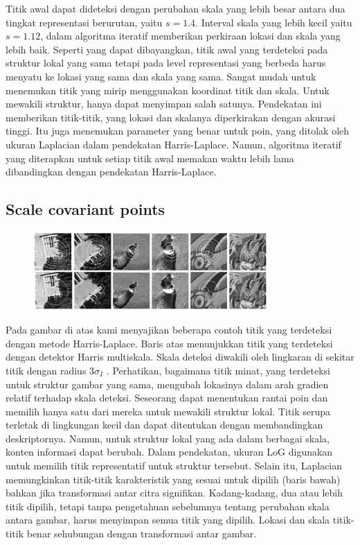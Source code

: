 Titik awal dapat dideteksi dengan perubahan skala yang lebih besar antara dua tingkat representasi berurutan, yaitu \(s = 1.4\). Interval skala yang lebih kecil yaitu \(s = 1.12\), dalam algoritma iteratif memberikan perkiraan lokasi dan skala yang lebih baik. Seperti yang dapat dibayangkan, titik awal yang terdeteksi pada struktur lokal yang sama tetapi pada level representasi yang berbeda harus menyatu ke lokasi yang sama dan skala yang sama. Sangat mudah untuk menemukan titik yang mirip menggunakan koordinat titik dan skala. Untuk mewakili struktur, hanya dapat menyimpan salah satunya. Pendekatan ini memberikan titik-titik, yang lokasi dan skalanya diperkirakan dengan akurasi tinggi. Itu juga menemukan parameter yang benar untuk poin, yang ditolak oleh ukuran Laplacian dalam pendekatan Harris-Laplace. Namun, algoritma iteratif yang diterapkan untuk setiap titik awal memakan waktu lebih lama dibandingkan dengan pendekatan Harris-Laplace.

\subsection{Scale covariant points}
\begin{figure}
  \centering{}
  \includegraphics[width=0.8\textwidth]{gambar/Scale invariant interest point detection.jpg}
  \caption{}
\end{figure}

Pada gambar di atas kami menyajikan beberapa contoh titik yang terdeteksi dengan metode Harris-Laplace. Baris atas menunjukkan titik yang terdeteksi dengan detektor Harris multiskala. Skala deteksi diwakili oleh lingkaran di sekitar titik dengan radius \(3\sigma_{I}\) . Perhatikan, bagaimana titik minat, yang terdeteksi untuk struktur gambar yang sama, mengubah lokasinya dalam arah gradien relatif terhadap skala deteksi. Seseorang dapat menentukan rantai poin dan memilih hanya satu dari mereka untuk mewakili struktur lokal. Titik serupa terletak di lingkungan kecil dan dapat ditentukan dengan membandingkan deskriptornya. Namun, untuk struktur lokal yang ada dalam berbagai skala, konten informasi dapat berubah. Dalam pendekatan, ukuran LoG digunakan untuk memilih titik representatif untuk struktur tersebut. Selain itu, Laplacian memungkinkan titik-titik karakteristik yang sesuai untuk dipilih (baris bawah) bahkan jika transformasi antar citra signifikan. Kadang-kadang, dua atau lebih titik dipilih, tetapi tanpa pengetahuan sebelumnya tentang perubahan skala antara gambar, harus menyimpan semua titik yang dipilih. Lokasi dan skala titik-titik benar sehubungan dengan transformasi antar gambar.

